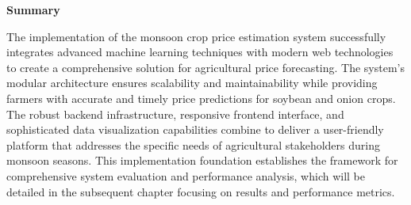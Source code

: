 \vspace{0.75cm}

\textbf{Summary}

The implementation of the monsoon crop price estimation system successfully integrates advanced machine learning techniques with modern web technologies to create a comprehensive solution for agricultural price forecasting. The system's modular architecture ensures scalability and maintainability while providing farmers with accurate and timely price predictions for soybean and onion crops. The robust backend infrastructure, responsive frontend interface, and sophisticated data visualization capabilities combine to deliver a user-friendly platform that addresses the specific needs of agricultural stakeholders during monsoon seasons. This implementation foundation establishes the framework for comprehensive system evaluation and performance analysis, which will be detailed in the subsequent chapter focusing on results and performance metrics.